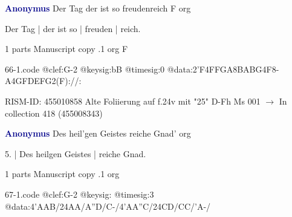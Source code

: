 \documentclass[twocolumn]{book}
\begin{document}
\newline \par \vspace{7pt} \textcolor{darkblue}{\textbf{Anonymus  }}
\newline Der Tag der ist so freudenreich  F  
\newline org
\newline \begin{itshape}[f.25r, at left:] Der Tag | der ist so | freuden | reich.\end{itshape} 
\newline \textcolor{darkblue}{}  1 parts  
\newline Manuscript copy
.1  org  F  
\begin{filecontents*}{66-1.code}
@clef:G-2
@keysig:bB
@timesig:0
@data:2'F4FFGA{8BABG}4F8-A4GFDEFG2(F)://:
\end{filecontents*}
\newline
%

\newline RISM-ID: 455010858
\newline Alte Foliierung auf f.24v mit "25"
\newline D-Fh  Ms 001
\newline $\rightarrow$ In collection 418 (455008343)

\newline \par \vspace{7pt} \textcolor{darkblue}{\textbf{Anonymus  }}
\newline Des heil'gen Geistes reiche Gnad'    
\newline org
\newline \begin{itshape}[f.5r, at left:] 5. | Des heilgen Geistes | reiche Gnad.\end{itshape} 
\newline \textcolor{darkblue}{}  1 parts  
\newline Manuscript copy
.1  org  
\begin{filecontents*}{67-1.code}
@clef:G-2
@keysig:
@timesig:3
@data:4'AAB/24AA/A''D/C-/4'AA''C/24CD/CC/'A-/
\end{filecontents*}
\newline
%
\end{document}
